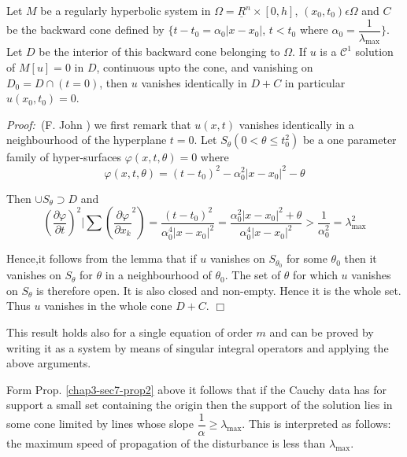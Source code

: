 \begin{proposition}\label{chap3-sec7-prop2}%
Let $M$ be a regularly hyperbolic system in $\Omega = \underline{R}^n
\times[0, h]$, $(x_0, t_0) \epsilon \Omega$ and $C$ be the backward
cone defined by $\Big\{t - t_0 = \alpha_0 | x - x_0|$, $t < t_0 $ where
$\alpha_0 = \dfrac{1}{\lambda_{\max}}\Big\}$. Let $D$ be the interior of
this backward cone belonging to $\Omega$. If $u$ is a $\mathscr{C}^1$
solution of $M[ u ] = 0$ in $D$, continuous upto the cone, and
vanishing on $D_0 = D \cap (t = 0)$, then $u$ vanishes identically in
$D + C$  in particular $u(x_0, t_0) = 0$. 
\end{proposition} 

\noindent
{\it Proof:}~(F. John \cite{key1})%
 we first remark that $u(x, t)$ vanishes identically in a
 neighbourhood of the hyperplane $t = 0$. Let $S_{\theta}(0 <  \theta
 \leq t^2_0)$ be a one parameter family of hyper-surfaces $\varphi (x,
 t, \theta) = 0$ where 
\begin{equation}
\varphi (x, t, \theta ) = (t - t_0)^2- \alpha ^2_0 | x-x_0|^2- \theta
\tag{7.11} \label{chap3-eq7.11}
\end{equation}

Then $\cup S_\theta \supset D$ and
 \begin{equation}
\left(\frac{\partial \varphi}{ \partial t}\right)^2 \Bigg| \sum
\left(\frac{\partial \varphi}{\partial x_k}^2\right) = 
  \frac{(t-t_0)^2}{\alpha^4_0 |
     x-x_0|^2}= \frac{ \alpha^2_0 | x-x_0 |^2 + \theta}{ \alpha^4_0 |
     x-x_0 |^2}> \frac{1}{ \alpha^2_0}= \lambda^2_{\max}
  \tag{7.12}\label{chap3-eq7.12}  
 \end{equation} 

 Hence,\pageoriginale it follows from the lemma that if $u$ vanishes on
 $S_{\theta_{0}}$ for some $\theta_0$ then it vanishes on $S_\theta$ for
 $\theta$ in a neighbourhood of $\theta_0$. The set of $\theta$ for which
 $u$ vanishes on $S_\theta$ is therefore open. It is also closed and
 non-empty. Hence it is the whole set. Thus $u$ vanishes in the whole
 cone $D + C$. \hfill $\Box$

\setcounter{remark}{0} 
\begin{remark}\label{chap3-sec7-rem1}%
This result holds also for a single equation of order $m$ and can be
proved by writing it as a system by means of singular integral
operators and applying the above arguments. 
\end{remark} 

\begin{remark}\label{chap3-sec7-rem2}%
Form Prop. \ref{chap3-sec7-prop2} above it follows that if the
Cauchy data has for support a 
small set containing the origin then the support of the solution lies
in some cone limited by lines whose slope $\dfrac{1}{\alpha}\geq
\lambda_{\max}$. This is interpreted as follows: the maximum speed of
propagation of the disturbance is less than $\lambda_{\max}$. 
\end{remark} 

